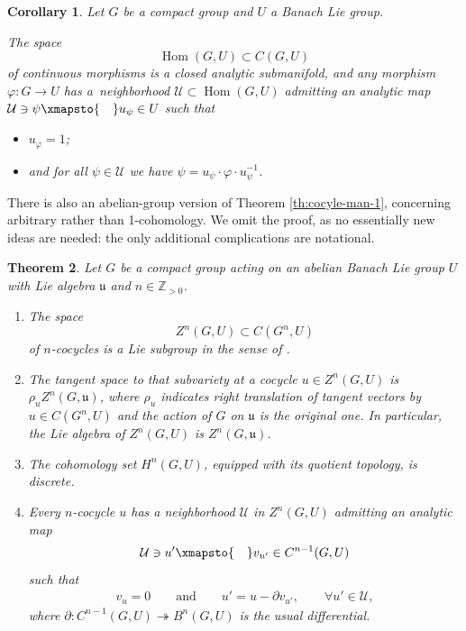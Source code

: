 \documentclass[10pt,a4paper]{amsart}
\numberwithin{equation}{section}
\newtheorem{Theorem}{Theorem}[section]
\newtheorem{Corollary}[Theorem]{Corollary}
\newcommand\bZ{{\mathbb Z}}
\newcommand\cU{{\mathcal U}}
\newcommand\fu{{\mathfrak u}}
\DeclareMathOperator{\Hom}{\mathrm{Hom}}
\begin{document}
\begin{Corollary}\label{cor:morsplit}
 Let $G$ be a compact group and $U$ a Banach Lie group.

 The space
 \begin{equation*}
 \Hom(G,U)\subset C(G,U)
 \end{equation*}
 of continuous morphisms is a closed analytic submanifold, and any morphism $\varphi\colon G\to U$ has a~neighborhood $\cU\subset \Hom(G,U)$ admitting an analytic map $\cU\ni \psi\xmapsto{\quad}u_{\psi}\in U$ such that
 \begin{itemize}\itemsep=0pt
 \item $u_{\varphi}=1$;
 \item and for all $\psi\in \cU$ we have $\psi = u_{\psi}\cdot \varphi\cdot u_{\psi}^{-1}$. \qedhere
 \end{itemize}
\end{Corollary}

There is also an abelian-group version of Theorem \ref{th:cocyle-man-1}, concerning arbitrary rather than 1-cohomology. We omit the proof, as no essentially new ideas are needed: the only additional complications are notational.

\begin{Theorem}\label{th:cocyle-man-n}
 Let $G$ be a compact group acting on an abelian Banach Lie group $U$ with Lie algebra $\fu$ and $n\in \bZ_{>0}$.
 \begin{enumerate}[$(1)$]\itemsep=0pt
 \item\label{item:3} The space
 \begin{equation*}
 Z^n(G,U)\subset C(G^n,U)
 \end{equation*}
 of $n$-cocycles is a Lie subgroup in the sense of {\rm\cite[\emph{Section}~III.1.3, \emph{Definition}~3]{bourb-lie-13}}.
 \item\label{item:4} The tangent space to that subvariety at a cocycle ${u}\in Z^n(G,U)$ is $\rho_{u} Z^n(G,\fu)$, where $\rho_{u}$ indicates right translation of tangent vectors by ${u}\in C(G^n,U)$ and the action of $G$ on $\fu$ is the original one.
 In particular, the Lie algebra of $Z^n(G,U)$ is $Z^n(G,\fu)$.
 \item\label{item:5} The cohomology set $H^n(G,U)$, equipped with its quotient topology, is discrete.
 \item\label{item:6} Every $n$-cocycle ${u}$ has a neighborhood $\cU$ in $Z^n(G,U)$ admitting an analytic map
 \begin{equation*}
 \cU\ni {u'}\xmapsto{\quad} v_{u'}\in C^{n-1}(G,U)
 \end{equation*}
 such that
 \begin{align*}
 v_{u} =0\qquad\text{and}\qquad
 u' =u-\partial v_{u'},\qquad \forall u'\in \cU,
 \end{align*}
 where $\partial\colon C^{n-1}(G,U)\twoheadrightarrow B^n(G,U)$ is the usual differential. \qedhere
\end{enumerate}
\end{Theorem}
\end{document}
